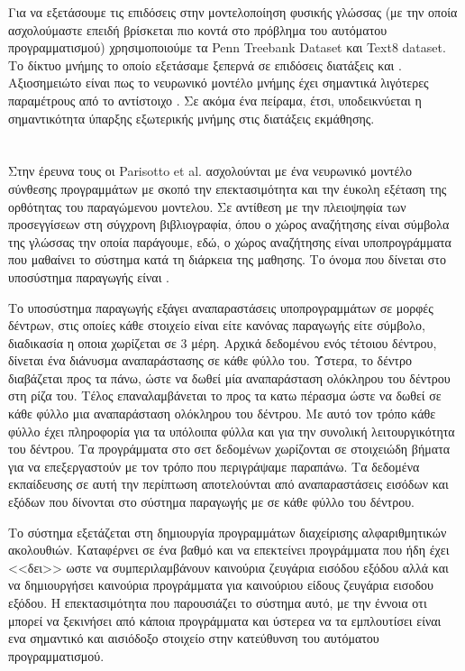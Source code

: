 Για να εξετάσουμε τις επιδόσεις στην μοντελοποίηση φυσικής γλώσσας (με την οποία ασχολούμαστε επειδή βρίσκεται πιο κοντά στο πρόβλημα του αυτόματου προγραμματισμού) χρησιμοποιούμε τα Penn Treebank Dataset και Text8 dataset. Το δίκτυο μνήμης το οποίο εξετάσαμε ξεπερνά σε επιδόσεις διατάξεις  και . Αξιοσημειώτο είναι πως το νευρωνικό μοντέλο μνήμης έχει σημαντικά λιγότερες παραμέτρους από το αντίστοιχο . Σε ακόμα ένα πείραμα, έτσι, υποδεικνύεται η σημαντικότητα ύπαρξης εξωτερικής μνήμης στις διατάξεις εκμάθησης.

\section{}

Στην έρευνα τους οι Parisotto et al. ασχολούνται με ένα νευρωνικό μοντέλο σύνθεσης προγραμμάτων με σκοπό την επεκτασιμότητα και την έυκολη εξέταση της ορθότητας του παραγώμενου μοντελου.
Σε αντίθεση με την πλειοψηφία των προσεγγίσεων στη σύγχρονη βιβλιογραφία, όπου ο χώρος αναζήτησης είναι σύμβολα της γλώσσας την οποία παράγουμε, εδώ, ο χώρος αναζήτησης είναι υποπρογράμματα που μαθαίνει το σύστημα κατά τη διάρκεια της μαθησης. Το όνομα που δίνεται στο υποσύστημα παραγωγής είναι .


Το υποσύστημα παραγωγής εξάγει αναπαραστάσεις υποπρογραμμάτων σε μορφές δέντρων, στις οποίες κάθε στοιχείο είναι είτε κανόνας παραγωγής είτε σύμβολο, διαδικασία η οποια χωρίζεται σε 3 μέρη.
Αρχικά δεδομένου ενός τέτοιου δέντρου, δίνεται ένα διάνυσμα αναπαράστασης σε κάθε φύλλο του.
Ύστερα, το δέντρο διαβάζεται προς τα πάνω, ώστε να δωθεί μία αναπαράσταση ολόκληρου του δέντρου στη ρίζα του.
Τέλος επαναλαμβάνεται το προς τα κατω πέρασμα ώστε να δωθεί σε κάθε φύλλο μια αναπαράσταση ολόκληρου του δέντρου.
Με αυτό τον τρόπο κάθε φύλλο έχει πληροφορία για τα υπόλοιπα φύλλα και για την συνολική λειτουργικότητα του δέντρου. Τα προγράμματα στο σετ δεδομένων χωρίζονται σε στοιχειώδη βήματα για να επεξεργαστούν με τον τρόπο που περιγράψαμε παραπάνω. Τα δεδομένα εκπαίδευσης σε αυτή την περίπτωση αποτελούνται από αναπαραστάσεις εισόδων και εξόδων που δίνονται στο σύστημα παραγωγής με σε κάθε φύλλο του δέντρου.

Το σύστημα εξετάζεται στη δημιουργία προγραμμάτων διαχείρισης αλφαριθμητικών ακολουθιών. Καταφέρνει σε ένα βαθμό και να επεκτείνει προγράμματα που ήδη έχει <<δει>> ωστε να συμπεριλαμβάνουν καινούρια ζευγάρια εισόδου εξόδου αλλά και να δημιουργήσει καινούρια προγράμματα για καινούριου είδους ζευγάρια εισοδου εξόδου. Η επεκτασιμότητα που παρουσιάζει το σύστημα αυτό, με την έννοια οτι μπορεί να ξεκινήσει από κάποια προγράμματα και ύστερεα να τα εμπλουτίσει είναι ενα σημαντικό και αισιόδοξο στοιχείο στην κατεύθυνση του αυτόματου προγραμματισμού. 
